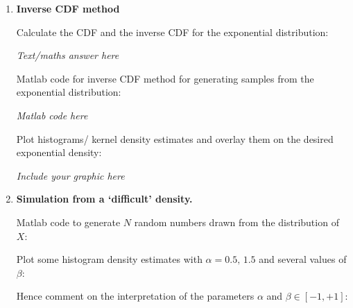 \documentclass[12pt]{article}
\begin{document}
\begin{enumerate}
{\em Include your graphic here}
\vspace{3in}




Now take $p(x)={\cal N}(x|0,1)$ and $f(x)=x^2$. Calculate $p(y)$ using the Jacobian formula:

{\em Text/maths answer  here}
\vspace{3in}




 Verify your result by histogramming of transformed random samples:


{\em Include your graphic here}
\vspace{3in}


\item{\bf Inverse CDF method} 



Calculate the CDF and the inverse CDF for the exponential distribution: 


{\em Text/maths answer  here}
\vspace{3in}



Matlab code for inverse CDF method for generating samples from the exponential distribution:


{\em Matlab code  here}
\vspace{3in}



Plot histograms/ kernel density estimates and overlay them on the desired exponential density:


{\em Include your graphic here}
\vspace{3in}

\item {\bf Simulation from a `difficult'  density.}

Matlab code to generate $N$ random numbers drawn from the distribution of $X$:
\vspace{3in}

Plot some histogram density estimates with $\alpha=0.5,\,1.5$ and several values of $\beta$:

\vspace{3in}


Hence comment on the interpretation of the parameters $\alpha$ and $\beta\in[-1,+1]$:


\end{enumerate}
\end{document}
